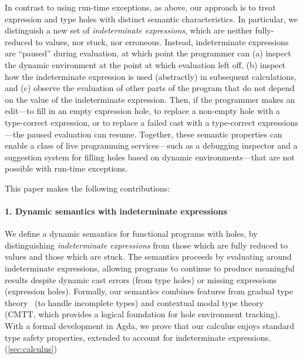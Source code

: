 
In contrast to using run-time exceptions, as above, our approach is to treat
expression and type holes with distinct semantic characteristics.
%
In particular, we distinguish a new set of \emph{indeterminate expressions},
which are neither fully-reduced to values, nor stuck, nor erroneous.
%
Instead, indeterminate expressions are ``paused'' during evaluation, at which
point the programmer can
%
(a) inspect the dynamic environment at the point at which evaluation left off,
%
(b) inspect how the indeterminate expression is used (abstractly) in subsequent
calculations, and
%
(c) observe the evaluation of other parts of the program that do not depend on
the value of the indeterminate expression.
%
Then, if the programmer makes an edit---to fill in an empty expression hole, to
replace a non-empty hole with a type-correct expression, or to replace a failed
cast with a type-correct expressions---the paused evaluation can resume.
%
Together, these semantic properties can enable a class of live programming
services---such as a debugging inspector and a suggestion system for filling
holes based on dynamic environments---that are not possible with run-time
exceptions.


\newcommand{\contribution}[2]{\paragraph{#1. #2}}

This paper makes the following contributions:


%
\contribution{1}{Dynamic semantics with indeterminate expressions}
%
We define a dynamic semantics for functional programs with holes, by
distinguishing \emph{indeterminate expressions} from those which are fully
reduced to values and those which are stuck.
%
The semantics proceeds by evaluating around indeterminate expressions, allowing
programs to continue to produce meaningful results despite dynamic cast errors
(from type holes) or missing expressions (expression holes).
%
Formally, our semantics combines features from gradual type theory~\cite{XXX}
(to handle incomplete types) and contextual modal type theory~\cite{XXX} (CMTT,
which provides a logical foundation for hole environment tracking).
%
With a formal development in Agda, we prove that our calculus enjoys standard
type safety properties, extended to account for indeterminate expressions.
%
(\autoref{sec:calculus})

